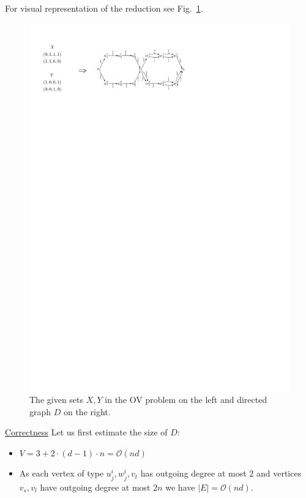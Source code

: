 \documentclass[12pt]{article}
\begin{document}
For visual representation of the reduction see Fig.~\ref{fig:ov_to_cflr}.

\begin{figure}[!htp]
		
	\begin{center}  
		\includegraphics[scale=1.2]{pictures/ov_to_cflr.pdf}
	\end{center}
	
	\caption{The given sets $X, Y$ in the OV problem on the left and directed graph $D$ on the right.}
	\label{fig:ov_to_cflr}
	
\end{figure}

\underline{Correctness} Let us first estimate the size of $D$:

\begin{itemize}
    \item $V = 3 + 2 \cdot (d-1) \cdot n = \mathcal{O}(nd)$
    \item As each vertex of type $u^i_j, w^i_j, v_t$ has outgoing degree at most 2 and vertices $v_s, v_l$ have outgoing degree at most $2n$ we have $|E| = \mathcal{O}(nd)$.
\end{itemize}
\end{document}

